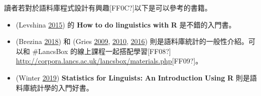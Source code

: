 讀者若對於語料庫程式設計有興趣[FF0C?]以下是可以參考的書籍。

\begin{itemize}
\item (Levshina \hyperlink{bookmarkid3tbugp1}{2015}) 的 \textbf{How} \textbf{to} \textbf{do} \textbf{linguistics} \textbf{with} \textbf{R} 是不錯的入門書。

\item (Brezina \hyperlink{bookmarkid41mghml}{2018}) 和 (Gries \hyperlink{bookmarkid3fwokq0}{2009}, \hyperlink{bookmarkid1v1yuxt}{2010}, \hyperlink{bookmarkid4f1mdlm}{2016}) 則是語料庫統計的一般性介紹。可以和 \#LancsBox 的線上課程一起搭配學習[FF08?] \url{http://corpora.lancs.ac.uk/lancsbox/materials.php}[FF09?]。

\item (Winter \hyperlink{bookmarkid46r0co2}{2019}) \textbf{Statistics} \textbf{for} \textbf{Linguists:} \textbf{An} \textbf{Introduction} \textbf{Using} \textbf{R} 則是語料庫統計學的入門好書。

\end{itemize}






